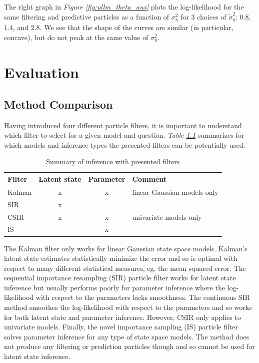 \documentclass[11pt, oneside]{scrreprt}   	%
\begin{document}
The right graph in \textit{Figure \ref{fig:ullm_theta_aux}} plots the log-likelihood for the same filtering and predictive particles as a function of $\sigma_{\eta}^2$ for 3 choices of $\tilde{\sigma}_{\eta}^2$: $0.8$, $1.4$, and $2.8$. We see that the shape of the curves are similar (in particular, concave), but do not peak at the same value of $\sigma_{\eta}^2$. 

\chapter{Evaluation}
\label{chp:evaluation}

\section{Method Comparison}
Having introduced four different particle filters, it is important to understand which filter to select for a given model and question. \textit{Table \ref{tab:filter_summary}} summarizes for which models and inference types the presented filters can be potentially used. \\

\begin{table}[h!]
\centering
\begin{tabular}{lccl}
\hline
Filter  & Latent state & Parameter & Comment\\
\hline
Kalman    & x & x & linear Gaussian models only\\
SIR      & x & &\\
CSIR      & x & x & univariate models only\\
IS      & & x & \\
\hline
\end{tabular}
\caption{Summary of inference with presented filters}
\label{tab:filter_summary}
\end{table}

The Kalman filter only works for linear Gaussian state space models. Kalman's latent state estimates statistically minimize the error and so is optimal with respect to many different statistical measures, eg. the mean squared error.  The sequential importance resampling (SIR) particle filter works for latent state inference but usually performs poorly for parameter inference where the log-likelihood with respect to the parameters lacks smoothness. The continuous SIR method smoothes the log-likelihood with respect to the parameters and so works for both latent state and parameter inference. However, CSIR only applies to univariate models. Finally, the novel importance sampling (IS) particle filter solves parameter inference for any type of state space models. The method does not produce any filtering or prediction particles though and so cannot be used for latent state inference. 
\end{document}
